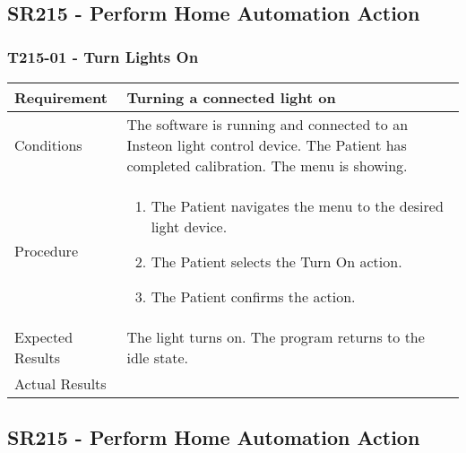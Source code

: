 \documentclass{article}
\begin{document}
\hfill \\

\subsection{SR215 - Perform Home Automation Action}
\subsubsection{T215-01 - Turn Lights On}
\begin{tabular}{| l | p{12cm} |}
    \hline
	Requirement & Turning a connected light on \\ \hline
	Conditions & The software is running and connected to an Insteon light
	control device. The Patient has completed calibration. The menu is
	showing. \\
	\hline
	Procedure &
\begin{enumerate}
	\item The Patient navigates the menu to the desired light device.
	\item The Patient selects the Turn On action.
	\item The Patient confirms the action.
\end{enumerate} \\ \hline
	Expected Results & The light turns on. The program returns to the idle state. \\ \hline
	Actual Results & \vspace{1cm} \\ \hline
\end{tabular}

\subsection{SR215 - Perform Home Automation Action}
\end{document}
